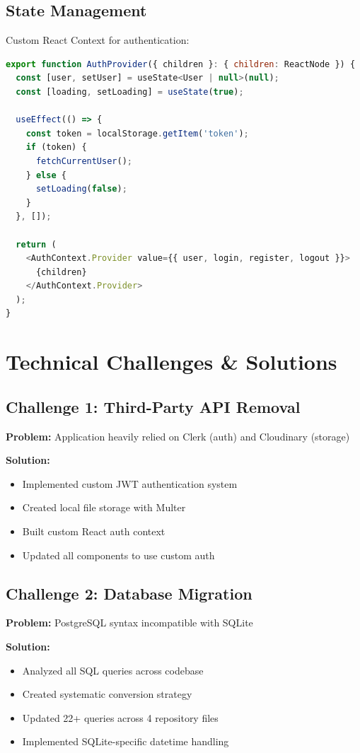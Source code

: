 \documentclass[11pt,a4paper]{article}
\begin{document}
\subsection{State Management}

Custom React Context for authentication:

\begin{lstlisting}[language=JavaScript, caption=Auth Context Provider]
export function AuthProvider({ children }: { children: ReactNode }) {
  const [user, setUser] = useState<User | null>(null);
  const [loading, setLoading] = useState(true);
  
  useEffect(() => {
    const token = localStorage.getItem('token');
    if (token) {
      fetchCurrentUser();
    } else {
      setLoading(false);
    }
  }, []);
  
  return (
    <AuthContext.Provider value={{ user, login, register, logout }}>
      {children}
    </AuthContext.Provider>
  );
}
\end{lstlisting}

\section{Technical Challenges \& Solutions}

\subsection{Challenge 1: Third-Party API Removal}

\textbf{Problem:} Application heavily relied on Clerk (auth) and Cloudinary (storage)

\textbf{Solution:}
\begin{itemize}[leftmargin=*]
    \item Implemented custom JWT authentication system
    \item Created local file storage with Multer
    \item Built custom React auth context
    \item Updated all components to use custom auth
\end{itemize}

\subsection{Challenge 2: Database Migration}

\textbf{Problem:} PostgreSQL syntax incompatible with SQLite

\textbf{Solution:}
\begin{itemize}[leftmargin=*]
    \item Analyzed all SQL queries across codebase
    \item Created systematic conversion strategy
    \item Updated 22+ queries across 4 repository files
    \item Implemented SQLite-specific datetime handling
\end{itemize}
\end{document}
